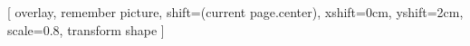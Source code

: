 [
overlay,
remember picture,  %
shift={(current page.center)},  %
xshift=0cm,  %
yshift=2cm,    %
scale=0.8, %
transform shape %
]
